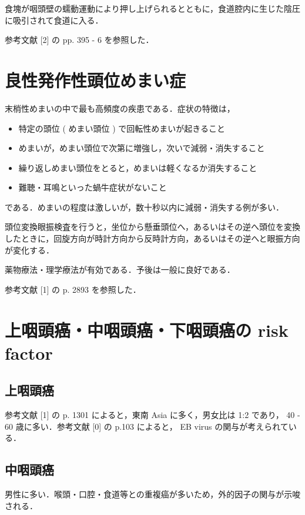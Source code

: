 \documentclass[10pt,uplatex]{jsarticle}
\begin{document}
食塊が咽頭壁の蠕動運動により押し上げられるとともに，食道腔内に生じた陰圧に吸引されて食道に入る．

\vspace{1em}

参考文献 [2] の pp. 395 - 6 を参照した．

\section{良性発作性頭位めまい症}

末梢性めまいの中で最も高頻度の疾患である．症状の特徴は，

\begin{itemize}
\item 特定の頭位 ( めまい頭位 ) で回転性めまいが起きること
\item めまいが，めまい頭位で次第に増強し，次いで減弱・消失すること
\item 繰り返しめまい頭位をとると，めまいは軽くなるか消失すること
\item 難聴・耳鳴といった蝸牛症状がないこと
\end{itemize}

である．めまいの程度は激しいが，数十秒以内に減弱・消失する例が多い．

頭位変換眼振検査を行うと，坐位から懸垂頭位へ，あるいはその逆へ頭位を変換したときに，回旋方向が時計方向から反時計方向，あるいはその逆へと眼振方向が変化する．

薬物療法・理学療法が有効である．予後は一般に良好である．

参考文献 [1] の p. 2893 を参照した．

\section{上咽頭癌・中咽頭癌・下咽頭癌の risk factor}

\subsection{上咽頭癌}

参考文献 [1] の p. 1301 によると，東南 Asia に多く，男女比は 1:2 であり， 40 - 60 歳に多い．参考文献 [0] の p.103 によると， EB virus の関与が考えられている．

\subsection{中咽頭癌}

男性に多い．喉頭・口腔・食道等との重複癌が多いため，外的因子の関与が示唆される．
\end{document}
